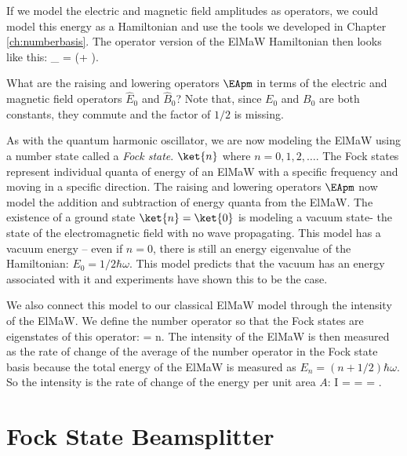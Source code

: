 If we model the electric and magnetic field amplitudes as operators, we could model this energy as a Hamiltonian and use the tools we developed in Chapter \ref{ch:numberbasis}. The operator version of the ElMaW Hamiltonian then looks like this:
\beq
{}_ = \left(\EAp\EAm + \right)\hbar \omega.
\eeq
\begin{exercise}
What are the raising and lowering operators $\EApm$ in terms of the electric and magnetic field operators $\hat{E}_0$ and $\hat{B}_0$? Note that, since $E_0$ and $B_0$ are both constants, they commute and the factor of $1/2$ is missing.
\end{exercise}

As with the quantum harmonic oscillator, we are now modeling the ElMaW using a number state called a {\em Fock state}. $\ket{n}$ where $n=0,1,2,\ldots$. The Fock states represent individual quanta of energy of an ElMaW with a specific frequency and moving in a specific direction. The raising and lowering operators $\EApm$ now model the addition and subtraction of energy quanta from the ElMaW. The existence of a ground state $\ket{n}= \ket{0}$ is modeling a vacuum state- the state of the electromagnetic field with no wave propagating. This model has a vacuum energy -- even if $n=0$, there is still an energy eigenvalue of the Hamiltonian: $E_0 = 1/2 \hbar\omega$. This model predicts that the vacuum has an energy associated with it and experiments have shown this to be the case.

We also connect this model to our classical ElMaW model through the intensity of the ElMaW. We define the number operator so that the Fock states are eigenstates of this operator:
\beq
\EN{} = n.
\eeq
The intensity of the ElMaW is then measured as the rate of change of the average of the number operator in the Fock state basis because the total energy of the ElMaW is measured as $E_n = (n+1/2)\hbar\omega$. So the intensity is the rate of change of the energy per unit area $A$:
\beq
I = =  \EN{} = .
\eeq


\section{Fock State Beamsplitter}


